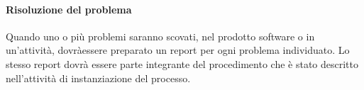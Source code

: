 		\paragraph{Risoluzione del problema}
			Quando uno o più problemi saranno scovati, nel prodotto software o in un'attività, dovràessere preparato un report per ogni problema individuato. Lo stesso report dovrà essere parte integrante del procedimento che è stato descritto nell'attività di instanziazione del processo.
